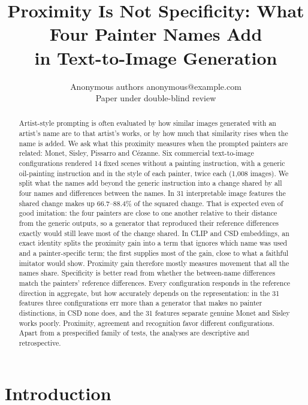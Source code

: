 \documentclass[10pt]{article}
\title{Proximity Is Not Specificity: What Four Painter Names Add\\in Text-to-Image Generation}
\author{\name Anonymous authors \email anonymous@example.com \\
      \addr Paper under double-blind review}
\begin{document}
\maketitle

\begin{abstract}
Artist-style prompting is often evaluated by how similar images generated with an artist's
name are to that artist's works, or by how much that similarity rises when the name is added.
We ask what this proximity measures when the prompted painters are related: Monet, Sisley,
Pissarro and C\'ezanne. Six commercial text-to-image configurations rendered 14 fixed scenes
without a painting instruction, with a generic oil-painting instruction and in the style of each
painter, twice each (1,008 images). We split what the names add beyond the generic instruction
into a change shared by all four names and differences between the names. In 31 interpretable
image features the shared change makes up 66.7--88.4\% of the squared change. That is expected
even of good imitation: the four painters are close to one another relative to their distance
from the generic outputs, so a generator that reproduced their reference differences exactly
would still leave most of the change shared. In CLIP and CSD embeddings, an exact identity splits
the proximity gain into a term that ignores which name was used and a painter-specific term; the
first supplies most of the gain, close to what a faithful imitator would show. Proximity gain
therefore mostly measures movement that all the names share. Specificity is better read from
whether the between-name differences match the painters' reference differences. Every
configuration responds in the reference direction in aggregate, but how accurately depends on the
representation: in the 31 features three configurations err more than a generator that makes no
painter distinctions, in CSD none does, and the 31 features separate genuine Monet and Sisley
works poorly. Proximity, agreement and recognition favor different configurations. Apart from a
prespecified family of tests, the analyses are descriptive and retrospective.
\end{abstract}

\section{Introduction}\label{sec:intro}
\end{document}
